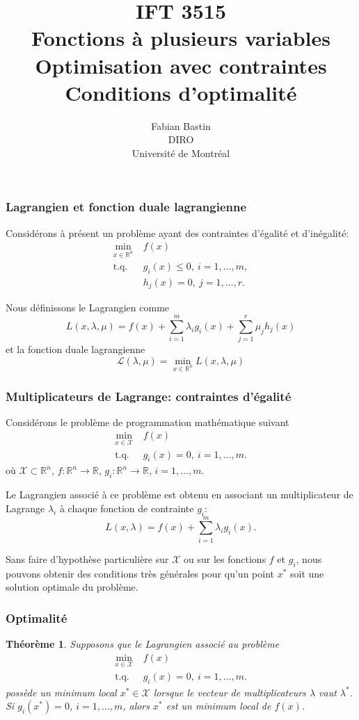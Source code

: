 \documentclass[usepdftitle=false]{beamer}
\title[IFT3515]{IFT 3515\\Fonctions à plusieurs variables\\Optimisation avec contraintes\\Conditions d'optimalité}
\author[Fabian Bastin]{Fabian Bastin\\DIRO\\Université de Montréal}
\date{}
\newtheorem{thm}{Théorème}
\def\red{\color{red}}
\def\cL{\mathcal{L}}
\def\cX{\mathcal{X}}
\def\RR{\mathbb{R}}
\begin{document}
\frame{\titlepage}


\begin{frame}
	\frametitle{Lagrangien et fonction duale lagrangienne}
	
	Considérons à présent un problème ayant des contraintes d'égalité et d'inégalité:
	\begin{align*}
		\min_{x \in \mathbb{R}^n} \ & f(x) \\
		\mbox{t.q. } & g_i(x) \leq 0,\ i = 1,\ldots,m, \\
		& h_j(x) = 0,\ j = 1,\ldots,r.
	\end{align*}
	
	Nous définissons le Lagrangien comme
	$$
	L(x, \lambda, \mu) = f(x) + \sum_{i = 1}^m \lambda_i g_i(x)
	+ \sum_{j = 1}^r \mu_j h_j(x)
	$$
	et la fonction duale lagrangienne
	$$
	\cL(\lambda, \mu) = \min_{x \in \mathbb{R}^n} L(x, \lambda, \mu)
	$$
	
\end{frame}

\begin{frame}
\frametitle{Multiplicateurs de Lagrange: contraintes d'égalité}

Considérons le problème de programmation mathématique suivant
\begin{align*}
\min_{x \in \cX} \ & f(x) \\
\mbox{t.q. } & g_i(x) = 0,\ i = 1,\ldots,m.
\end{align*}
où $\cX \subset \RR^n$, $f: \RR^n \rightarrow \RR$, $g_i: \RR^n \rightarrow \RR$, $i = 1,\ldots,m$.

\mbox{}

Le {\red Lagrangien} associé à ce problème est obtenu en associant un multiplicateur de Lagrange $\lambda_i$ à chaque fonction de contrainte $g_i$:
$$
L(x, \lambda) = f(x) + \sum_{i = 1}^{m} \lambda_i g_i(x).
$$

Sans faire d'hypothèse particulière sur $\cX$ ou sur les fonctions $f$ et $g_i$, nous pouvons obtenir des conditions très générales pour qu'un point $x^*$ soit une solution optimale du problème.

\end{frame}

\begin{frame}
\frametitle{Optimalité}

\begin{thm}
Supposons que le Lagrangien associé au problème
\begin{align*}
\min_{x \in \cX} \ & f(x) \\
\mbox{t.q. } & g_i(x) = 0,\ i = 1,\ldots,m.
\end{align*}
possède un minimum local $x^* \in \cX$ lorsque le vecteur de multiplicateurs $\lambda$ vaut $\lambda^*$.
Si $g_i(x^*) = 0$, $i = 1,\ldots,m$, alors $x^*$ est un minimum local de $f(x)$.
\end{thm}

\end{frame}
\end{document}
